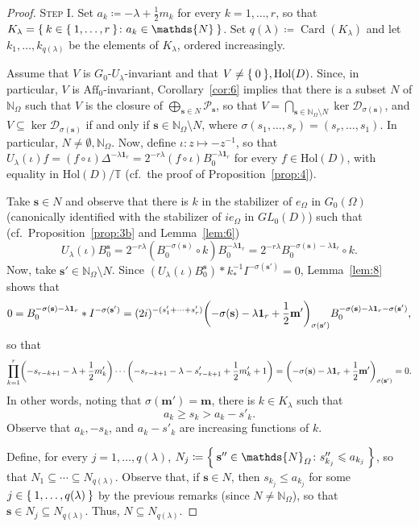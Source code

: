 \documentclass[10.5pt,reqno]{amsart}
\DeclareMathOperator{\card}{Card}
\newcommand{\Aff}{\mathrm{Aff}}
\newcommand{\Hol}{\mathrm{Hol}}
\newcommand{\vect}[1]{\mathbf{{#1}}}
\let\originalleft\left
\let\originalright\right
\renewcommand{\left}{\mathopen{}\mathclose\bgroup\originalleft}
\renewcommand{\right}{\aftergroup\egroup\originalright}
\newcommand{\N}{\mathds{N}}
\newcommand{\T}{\mathds{T}}
\newcommand{\Dc}{\mathcal{D}}
\newcommand{\Pc}{\mathcal{P}}
\newcommand{\meg}{\leqslant}
\newcommand{\Meg}{\geqslant}
\begin{document}
\begin{proof}
	\textsc{Step I.} Set $a_{k}\coloneqq -\lambda+\frac 1 2 m_k$ for every $k=1,\dots, r$, so that $K_\lambda= \Set{k\in \Set{1,\dots, r}\colon a_{k}\in \N}$. Set $q(\lambda)\coloneqq \card(K_\lambda)$ and let $k_1,\dots,k_{q(\lambda)}$ be the elements of $K_\lambda$, ordered increasingly.
	
	Assume that $V$ is $G_0$-$U_\lambda$-invariant and  that $V\neq \Set{0}, \Hol(D)$. Since, in particular, $V$ is $\Aff_0$-invariant, Corollary~\ref{cor:6} implies that   there is a subset $N$ of $\N_{\Omega}$ such that $V$ is the closure of $\bigoplus_{\vect s\in N}  \Pc_{\vect s}$, so  that $V=\bigcap_{\vect s\in  \N_{\Omega}\setminus N} \ker \Dc_{\sigma(\vect s)}$, and  $V\subseteq \ker \Dc_{\sigma(\vect s)}$ if and only if $\vect s\in \N_{\Omega}\setminus N$,  where $\sigma(s_1,\dots,s_r)=(s_r,\dots,s_1)$.
	In particular, $N\neq \emptyset, \N_\Omega$. 
	Now, define $\iota\colon z \mapsto -z^{-1}$, so that  $U_\lambda(\iota) f= (f\circ \iota) \Delta^{-\lambda \vect 1_r} =2^{-r\lambda}(f\circ \iota) B_0^{-\lambda \vect 1_r}$ for every $f\in \Hol(D)$, with equality in $\Hol(D)/\T$ (cf.~the proof of Proposition~\ref{prop:4}).  
	
	Take $\vect s\in N$ and observe that  there is $k$ in the stabilizer of  $e_\Omega$ in $G_0(\Omega)$ (canonically identified with the  stabilizer of $i e_\Omega$ in $GL_0(D)$) such that (cf.~Proposition~\ref{prop:3b} and Lemma~\ref{lem:6})
	\[
	U_\lambda(\iota) B^{\vect s}_{0}= 2^{-r \lambda}(B^{-\sigma(\vect s)}_0 \circ k) B_0^{-\lambda \vect 1_r}=  2^{-r \lambda} B^{-\sigma(\vect s)-\lambda\vect 1_r}_0 \circ k.
	\] 
	Now, take $\vect s'\in \N_\Omega \setminus N$. Since $(U_\lambda(\iota) B^{\vect s}_{0})* k^{-1}_* I^{-\sigma(\vect s')} =0$,  Lemma~\ref{lem:8} shows that
	\[
	0=B^{-\sigma(\vect s)-\lambda\vect 1_r}_0*I^{-\sigma(\vect s')}=(2i)^{-(s'_1+\cdots+s'_r)} \left(-\sigma(\vect s)-\lambda\vect 1_r+\frac 1 2 \vect m'\right)_{\sigma(\vect s')} B^{-\sigma(\vect s)-\lambda\vect 1_r-\sigma(\vect s')}_0,
	\]
	so that 
	\[
	\prod_{k=1}^r \left(-s_{r-k+1}-\lambda+ \frac 1 2 m'_{k}\right)\cdots \left(-s_{r-k+1}-\lambda - s'_{r-k+1}+ \frac 1 2 m'_{k}+1\right)= \left(-\sigma(\vect s)-\lambda\vect 1_r+\frac 1 2 \vect m'\right)_{\sigma(\vect s')}=0 .
	\]
	In other words, noting that $\sigma(\vect m')=\vect m$, there is $k\in K_\lambda$ such that
	\[
	a_k\Meg s_k>a_k-s'_k.
	\]
	Observe that $a_k, -s_k$, and $ a_k-s'_k$ are increasing functions of $k$.
	
	Define, for every $j=1,\dots, q(\lambda)$, $N_j\coloneqq \Set{ \vect s''\in \N_{\Omega}\colon s''_{k_j}\meg a_{k_j}}$, so that $N_1\subseteq\cdots \subseteq N_{q(\lambda)}$. Observe that, if $\vect s\in N$, then $s_{k_j}\meg a_{k_j}$ for some $j\in \Set{1,\dots, q(\lambda)}$ by the previous remarks (since $N\neq \N_\Omega$), so that $\vect s\in N_j\subseteq N_{q(\lambda)}$. Thus, $N\subseteq N_{q(\lambda)}$.
	

\end{proof}
\end{document}
